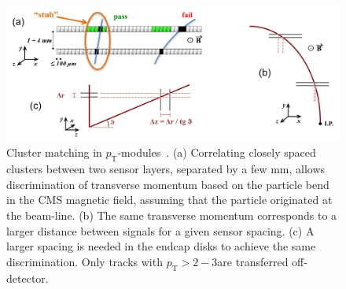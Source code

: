 \begin{figure}[!h]
\centering
\includegraphics[width=5in]{figs/tk-upgrade/pTsketches.png}
\caption{Cluster matching in $p_\mathrm{T}$-modules~\cite{P2TrackerTDR}. (a) Correlating closely spaced clusters between two sensor layers, separated by a few mm, allows discrimination of transverse momentum based on the particle bend in the CMS magnetic field, assuming that the particle originated at the beam-line. (b) The same transverse momentum corresponds to a larger distance between signals for a given sensor spacing. (c) A larger spacing is needed in the endcap disks to achieve the same discrimination. Only tracks with $p_{\mathrm{T}}>2-3$\GeVc are transferred off-detector.
}
\label{stubs}
\end{figure}
